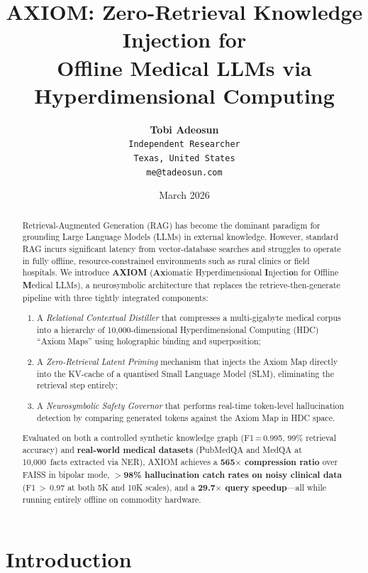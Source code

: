 \documentclass[11pt,a4paper]{article}
\title{%
    \textbf{AXIOM}: Zero-Retrieval Knowledge Injection for\\
    Offline Medical LLMs via Hyperdimensional Computing%
}
\author{
    \textbf{Tobi Adeosun}\\
    \texttt{Independent Researcher}\\
    \texttt{Texas, United States}\\
    \texttt{me@tadeosun.com}
}
\date{March 2026}
\begin{document}
\maketitle

\begin{abstract}
Retrieval-Augmented Generation (RAG) has become the dominant paradigm for
grounding Large Language Models (LLMs) in external knowledge.  However,
standard RAG incurs significant latency from vector-database searches and
struggles to operate in fully offline, resource-constrained environments such
as rural clinics or field hospitals.  We introduce \textbf{AXIOM}
(\textbf{Ax}iomatic Hyperdimensional
\textbf{I}njecti\textbf{o}n for Offline \textbf{M}edical LLMs),
a neurosymbolic architecture that
replaces the retrieve-then-generate pipeline with three tightly integrated
components:
\begin{enumerate}[nosep]
    \item A \emph{Relational Contextual Distiller} that compresses a multi-gigabyte
          medical corpus into a hierarchy of 10,000-dimensional
          Hyperdimensional Computing (HDC) ``Axiom Maps'' using
          holographic binding and superposition;
    \item A \emph{Zero-Retrieval Latent Priming} mechanism that injects the
          Axiom Map directly into the KV-cache of a quantised Small Language
          Model (SLM), eliminating the retrieval step entirely;
    \item A \emph{Neurosymbolic Safety Governor} that performs real-time
          token-level hallucination detection by comparing generated tokens
          against the Axiom Map in HDC space.
\end{enumerate}
Evaluated on both a controlled synthetic knowledge graph
(F1\,=\,0.995, 99\% retrieval accuracy) and \textbf{real-world medical
datasets} (PubMedQA and MedQA at 10,000~facts extracted via NER),
AXIOM achieves a \textbf{565$\times$ compression ratio} over
FAISS in bipolar mode, \textbf{$>$98\% hallucination catch rates on
noisy clinical data} (F1\,$>$\,0.97 at both 5K and 10K scales),
and a \textbf{29.7$\times$ query speedup}---all while running
entirely offline on commodity hardware.
\end{abstract}

\section{Introduction}
\label{sec:intro}
\end{document}

